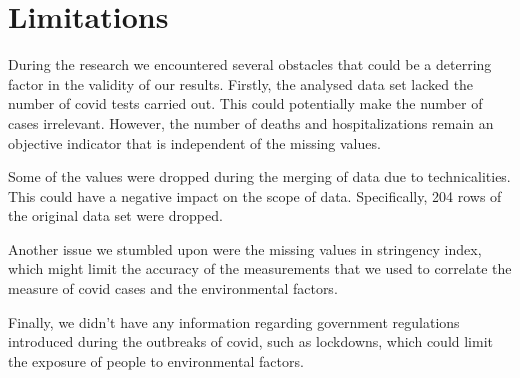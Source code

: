 \section{Limitations}

During the research we encountered several obstacles that could be a deterring factor in the validity of our results. Firstly, the analysed data set lacked the number of covid tests carried out. This could potentially make the number of cases irrelevant. However, the number of deaths and hospitalizations remain an objective indicator that is independent of the missing values. 

Some of the values were dropped during the merging of data due to technicalities. This could have a negative impact on the scope of data. Specifically, 204 rows of the original data set were dropped. 

Another issue we stumbled upon were the missing values in stringency index, which might limit the accuracy of the measurements that we used to correlate the measure of covid cases and the environmental factors. %

Finally, we didn't have any information regarding government regulations introduced during the outbreaks of covid, such as lockdowns, which could limit the exposure of people to environmental factors. %
